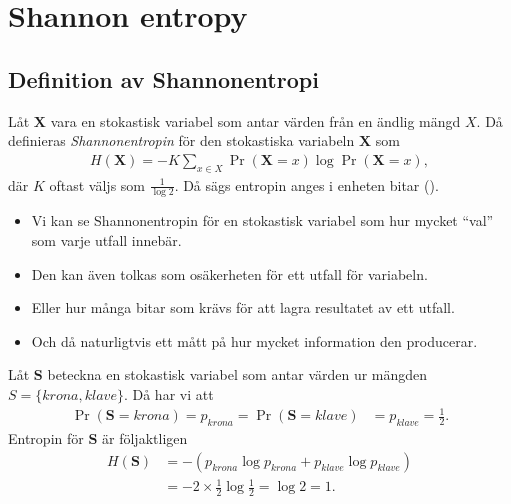 \documentclass{beamer}
\let\stoch\mathbf{}
\begin{document}
\section{Shannon entropy}

\subsection{Definition av Shannonentropi}

\begin{frame}
  \begin{definition}[Shannonentropi]
    Låt \(\stoch X\) vara en stokastisk variabel som antar värden från en 
    ändlig mängd \(X\).
    Då definieras \emph{Shannonentropin} för den stokastiska variabeln 
    \(\stoch X\) som
    \begin{align*}
      H(\stoch X) = -K \sum_{x\in X} \Pr(\stoch X = x)\log \Pr(\stoch X = x),
    \end{align*}
    där \(K\) oftast väljs som \(\frac{1}{\log 2}\).
    Då sägs entropin anges i enheten bitar (\bit).
  \end{definition}
\end{frame}

\begin{frame}
  \begin{itemize}
    \item Vi kan se Shannonentropin för en stokastisk variabel som hur mycket 
      \enquote{val} som varje utfall innebär.

    \item Den kan även tolkas som osäkerheten för ett utfall för variabeln.

    \item Eller hur många bitar som krävs för att lagra resultatet av ett 
      utfall.

    \item Och då naturligtvis ett mått på hur mycket information den 
      producerar.

  \end{itemize}
\end{frame}

\begin{frame}
  \begin{example}
    Låt \(\stoch S\) beteckna en stokastisk variabel som antar värden ur 
    mängden \(S = \{krona, klave\}\).
    Då har vi att
    \begin{align*}
      \Pr(\stoch S = krona) = p_{krona} = \Pr(\stoch S = klave) &= p_{klave} 
      = \frac{1}{2}.
    \end{align*}
    Entropin för \(\stoch S\) är följaktligen
    \begin{align*}
      H(\stoch S) &= -\left( p_{krona}\log p_{krona} + p_{klave}\log p_{klave} 
      \right) \\
        &= -2\times \frac{1}{2}\log \frac{1}{2} = \log 2 = 1.
    \end{align*}
  \end{example}
\end{frame}
\end{document}
